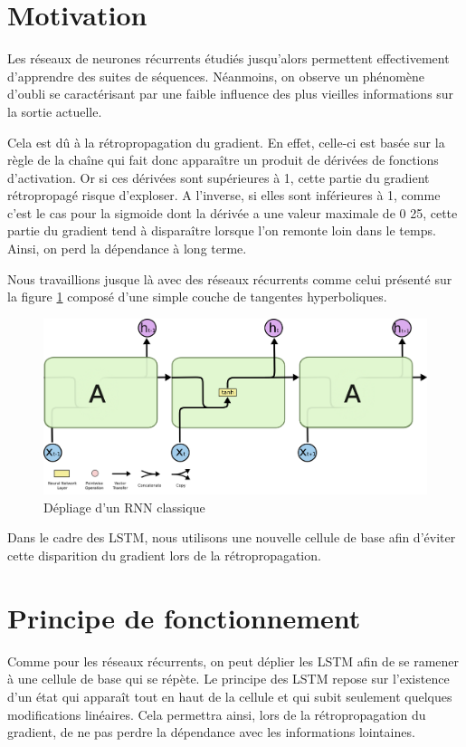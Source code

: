\documentclass{report}
\theoremstyle{plain}
\theoremstyle{definition}
\theoremstyle{remark}
\begin{document}
\section{Motivation}
Les réseaux de neurones récurrents étudiés jusqu'alors permettent effectivement d'apprendre des suites de séquences. Néanmoins, on observe un phénomène d'oubli se caractérisant par une faible influence des plus vieilles informations sur la sortie actuelle.

Cela est dû à la rétropropagation du gradient. En effet, celle-ci est basée sur la règle de la chaîne qui fait donc apparaître un produit de dérivées de fonctions d'activation. Or si ces dérivées sont supérieures à 1, cette partie du gradient rétropropagé risque d'exploser. A l'inverse, si elles sont inférieures à 1, comme c'est le cas pour la sigmoide dont la dérivée a une valeur maximale de 0
25, cette partie du gradient tend à disparaître lorsque l'on remonte loin dans le temps. Ainsi, on perd la dépendance à long terme.

Nous travaillions jusque là avec des réseaux récurrents comme celui présenté sur la figure \ref{RNN classique} composé d'une simple couche de tangentes hyperboliques.

\begin{figure}[h!]
\begin{center}
\includegraphics[scale=0.25]{images/RNN_classique.png}
\caption{Dépliage d'un RNN classique}
\label{RNN classique}
\end{center}
\end{figure}

Dans le cadre des LSTM, nous utilisons une nouvelle cellule de base afin d'éviter cette disparition du gradient lors de la rétropropagation.

\newpage

\section{Principe de fonctionnement}
Comme pour les réseaux récurrents, on peut déplier les LSTM afin de se ramener à une cellule de base qui se répète. Le principe des LSTM repose sur l'existence d'un état qui apparaît tout en haut de la cellule et qui subit seulement quelques modifications linéaires. Cela permettra ainsi, lors de la rétropropagation du gradient, de ne pas perdre la dépendance avec les informations lointaines.
\end{document}
